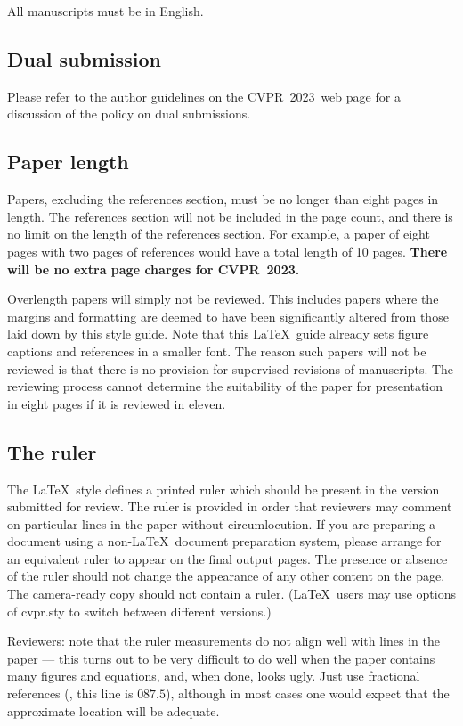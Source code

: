 \documentclass[10pt,twocolumn,letterpaper]{article}
\def\confName{CVPR}
\def\confYear{2023}
\begin{document}
All manuscripts must be in English.

\subsection{Dual submission}

Please refer to the author guidelines on the \confName\ \confYear\ web page for a
discussion of the policy on dual submissions.

\subsection{Paper length}
Papers, excluding the references section, must be no longer than eight pages in length.
The references section will not be included in the page count, and there is no limit on the length of the references section.
For example, a paper of eight pages with two pages of references would have a total length of 10 pages.
{\bf There will be no extra page charges for \confName\ \confYear.}

Overlength papers will simply not be reviewed.
This includes papers where the margins and formatting are deemed to have been significantly altered from those laid down by this style guide.
Note that this \LaTeX\ guide already sets figure captions and references in a smaller font.
The reason such papers will not be reviewed is that there is no provision for supervised revisions of manuscripts.
The reviewing process cannot determine the suitability of the paper for presentation in eight pages if it is reviewed in eleven.

\subsection{The ruler}
The \LaTeX\ style defines a printed ruler which should be present in the version submitted for review.
The ruler is provided in order that reviewers may comment on particular lines in the paper without circumlocution.
If you are preparing a document using a non-\LaTeX\ document preparation system, please arrange for an equivalent ruler to appear on the final output pages.
The presence or absence of the ruler should not change the appearance of any other content on the page.
The camera-ready copy should not contain a ruler.
(\LaTeX\ users may use options of cvpr.sty to switch between different versions.)

Reviewers:
note that the ruler measurements do not align well with lines in the paper --- this turns out to be very difficult to do well when the paper contains many figures and equations, and, when done, looks ugly.
Just use fractional references (\eg, this line is $087.5$), although in most cases one would expect that the approximate location will be adequate.
\end{document}
